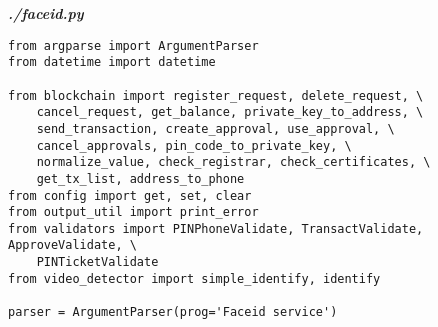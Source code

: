 \textit{\textbf{./faceid.py}}
\begin{verbatim}
from argparse import ArgumentParser
from datetime import datetime

from blockchain import register_request, delete_request, \ 
    cancel_request, get_balance, private_key_to_address, \
    send_transaction, create_approval, use_approval, \
    cancel_approvals, pin_code_to_private_key, \
    normalize_value, check_registrar, check_certificates, \
    get_tx_list, address_to_phone
from config import get, set, clear
from output_util import print_error
from validators import PINPhoneValidate, TransactValidate, ApproveValidate, \ 
    PINTicketValidate
from video_detector import simple_identify, identify

parser = ArgumentParser(prog='Faceid service')


\end{verbatim}
